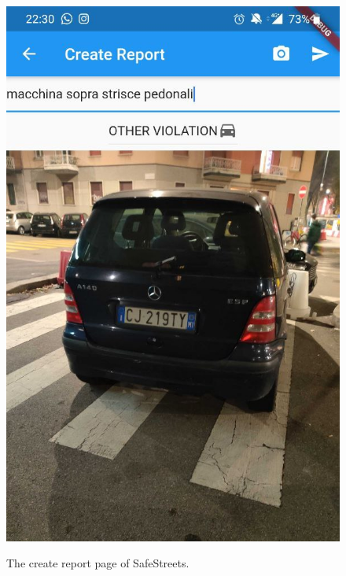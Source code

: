 \documentclass[../RASD.tex]{subfiles}
\begin{document}
    \begin{figure}[H]
        \centering
        \includegraphics[scale = 0.2]{assets/app_screenshots/createReport.png}\\
        \caption[\textit{Create Report} Screenshot]{The create report page of SafeStreets.}
    \end{figure}
\end{document}
